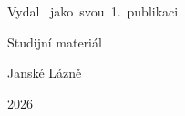 \documentclass[main.tex]{subfiles}
\begin{document}
\padtofour
\thispagestyle{empty}    %
\vspace*{\fill}

\begin{center}
\Large\bfseries\docname\par
\vspace{1.5em}
\large\docauth\par
\vspace{3em}
\normalsize
Vydal~\wayne{} jako~svou~1.~publikaci\par
\vspace{1em}
Studijní materiál\par
\vspace{1em}
Janské Lázně\par
2026
\end{center}
\end{document}
